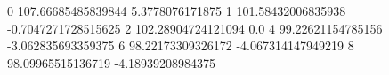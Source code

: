 0 107.66685485839844 5.3778076171875
1 101.58432006835938 -0.7047271728515625
2 102.28904724121094 0.0
4 99.22621154785156 -3.062835693359375
6 98.22173309326172 -4.067314147949219
8 98.09965515136719 -4.18939208984375
